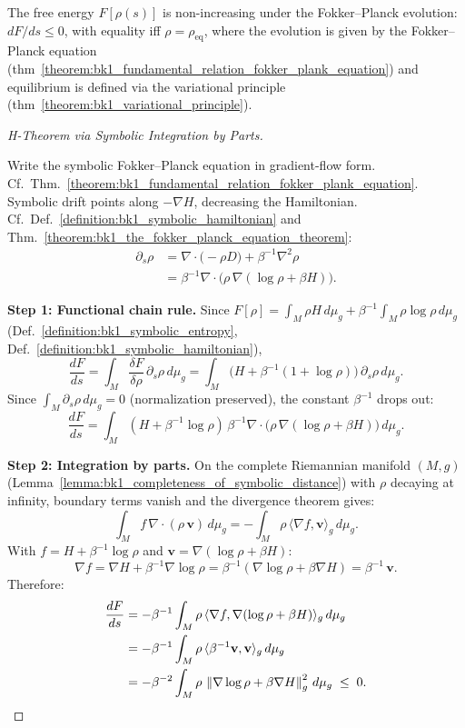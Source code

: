 \begin{theorem}
\label{theorem:bk1_h_theorem_for_symbolic_evolution}
The free energy $F[\rho(s)]$ is non-increasing under the Fokker–Planck evolution: $dF/ds \leq 0$, with equality iff $\rho = \rho_{\text{eq}}$, where the evolution is given by the Fokker–Planck equation (thm~\ref{theorem:bk1_fundamental_relation_fokker_plank_equation}) and equilibrium is defined via the variational principle (thm~\ref{theorem:bk1_variational_principle}).

\begin{proof}[H-Theorem via Symbolic Integration by Parts]
\label{proof:bk1_sketch_direct_evaluation}
\leavevmode

Write the symbolic Fokker--Planck equation in gradient-flow form.
Cf.~Thm.~\ref{theorem:bk1_fundamental_relation_fokker_plank_equation}.
Symbolic drift points along $-\nabla H$, decreasing the Hamiltonian.
Cf.~Def.~\ref{definition:bk1_symbolic_hamiltonian} and
Thm.~\ref{theorem:bk1_the_fokker_planck_equation_theorem}:
\[
\begin{aligned}
\partial_s \rho
&= \nabla\cdot\!\bigl(-\rho D\bigr) + \beta^{-1}\nabla^2\rho \\
&= \beta^{-1}\nabla\cdot\!\bigl(\rho\,\nabla(\log\rho + \beta H)\bigr).
\end{aligned}
\]

\textbf{Step 1: Functional chain rule.}
Since $F[\rho] = \int_M \rho H\,d\mu_g + \beta^{-1}\int_M\rho\log\rho\,d\mu_g$
(Def.~\ref{definition:bk1_symbolic_entropy}, Def.~\ref{definition:bk1_symbolic_hamiltonian}),
\[
\frac{dF}{ds}
= \int_M \frac{\delta F}{\delta\rho}\,\partial_s\rho\,d\mu_g
= \int_M \bigl(H + \beta^{-1}(1+\log\rho)\bigr)\,\partial_s\rho\,d\mu_g.
\]
Since $\int_M\partial_s\rho\,d\mu_g = 0$ (normalization preserved), the constant
$\beta^{-1}$ drops out:
\[
\frac{dF}{ds}
= \int_M (H + \beta^{-1}\log\rho)\,
  \beta^{-1}\nabla\cdot\!\bigl(\rho\,\nabla(\log\rho + \beta H)\bigr)\,d\mu_g.
\]

\textbf{Step 2: Integration by parts.}
On the complete Riemannian manifold $(M,g)$
(Lemma~\ref{lemma:bk1_completeness_of_symbolic_distance}) with $\rho$ decaying at infinity,
boundary terms vanish and the divergence theorem gives:
\[
\int_M f\,\nabla\cdot(\rho\,\mathbf{v})\,d\mu_g
= -\int_M \rho\,\langle\nabla f,\mathbf{v}\rangle_g\,d\mu_g.
\]
With $f = H + \beta^{-1}\log\rho$ and $\mathbf{v} = \nabla(\log\rho + \beta H)$:
\[
\nabla f
= \nabla H + \beta^{-1}\nabla\log\rho
= \beta^{-1}(\nabla\log\rho + \beta\nabla H)
= \beta^{-1}\,\mathbf{v}.
\]
Therefore:
\begin{align*}
\frac{dF}{ds}
&= -\beta^{-1}\int_M \rho\,\langle\nabla f, \nabla(\log\rho+\beta H)\rangle_g\,d\mu_g \\
&= -\beta^{-1}\int_M \rho\,\langle\beta^{-1}\mathbf{v},\mathbf{v}\rangle_g\,d\mu_g \\
&= -\beta^{-2}\int_M \rho\,\left\|\nabla\log\rho + \beta\nabla H\right\|_g^2\,d\mu_g \;\leq\; 0.
\end{align*}


\end{proof}
\end{theorem}
